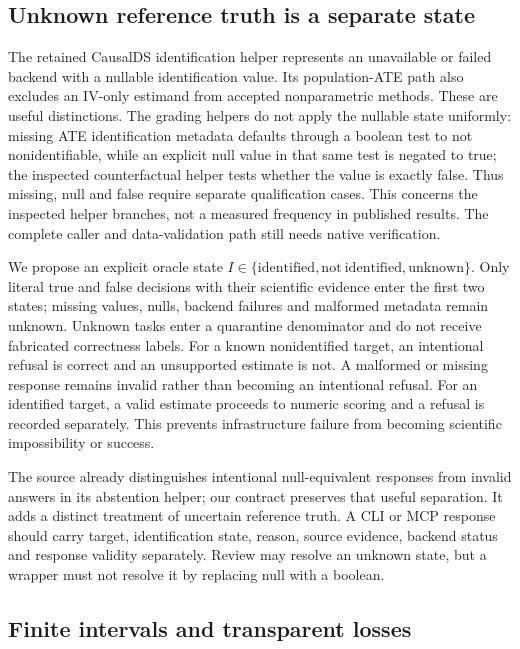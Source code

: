 \subsection{Unknown reference truth is a separate state}

The retained CausalDS identification helper represents an unavailable or failed backend with a nullable identification value. Its population-ATE path also excludes an IV-only estimand from accepted nonparametric methods. These are useful distinctions. The grading helpers do not apply the nullable state uniformly: missing ATE identification metadata defaults through a boolean test to not nonidentifiable, while an explicit null value in that same test is negated to true; the inspected counterfactual helper tests whether the value is exactly false. Thus missing, null and false require separate qualification cases. This concerns the inspected helper branches, not a measured frequency in published results. The complete caller and data-validation path still needs native verification.\citep{exec25_bor_sources}

We propose an explicit oracle state $I\in\{\mathrm{identified},\mathrm{not\ identified},\mathrm{unknown}\}$. Only literal true and false decisions with their scientific evidence enter the first two states; missing values, nulls, backend failures and malformed metadata remain unknown. Unknown tasks enter a quarantine denominator and do not receive fabricated correctness labels. For a known nonidentified target, an intentional refusal is correct and an unsupported estimate is not. A malformed or missing response remains invalid rather than becoming an intentional refusal. For an identified target, a valid estimate proceeds to numeric scoring and a refusal is recorded separately. This prevents infrastructure failure from becoming scientific impossibility or success.\citep{exec25_bor_reference}

The source already distinguishes intentional null-equivalent responses from invalid answers in its abstention helper; our contract preserves that useful separation. It adds a distinct treatment of uncertain reference truth. A CLI or MCP response should carry target, identification state, reason, source evidence, backend status and response validity separately. Review may resolve an unknown state, but a wrapper must not resolve it by replacing null with a boolean.\citep{exec25_bor_sources,exec25_bor_reference}

\subsection{Finite intervals and transparent losses}

